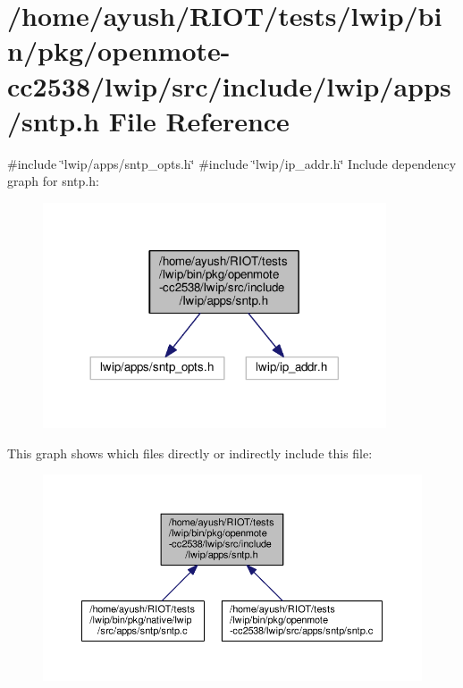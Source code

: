 \hypertarget{openmote-cc2538_2lwip_2src_2include_2lwip_2apps_2sntp_8h}{}\section{/home/ayush/\+R\+I\+O\+T/tests/lwip/bin/pkg/openmote-\/cc2538/lwip/src/include/lwip/apps/sntp.h File Reference}
\label{openmote-cc2538_2lwip_2src_2include_2lwip_2apps_2sntp_8h}
{\ttfamily \#include \char`\"{}lwip/apps/sntp\+\_\+opts.\+h\char`\"{}}\newline
{\ttfamily \#include \char`\"{}lwip/ip\+\_\+addr.\+h\char`\"{}}\newline
Include dependency graph for sntp.\+h\+:
\nopagebreak
\begin{figure}[H]
\begin{center}
\leavevmode
\includegraphics[width=288pt]{openmote-cc2538_2lwip_2src_2include_2lwip_2apps_2sntp_8h__incl}
\end{center}
\end{figure}
This graph shows which files directly or indirectly include this file\+:
\nopagebreak
\begin{figure}[H]
\begin{center}
\leavevmode
\includegraphics[width=350pt]{openmote-cc2538_2lwip_2src_2include_2lwip_2apps_2sntp_8h__dep__incl}
\end{center}
\end{figure}
